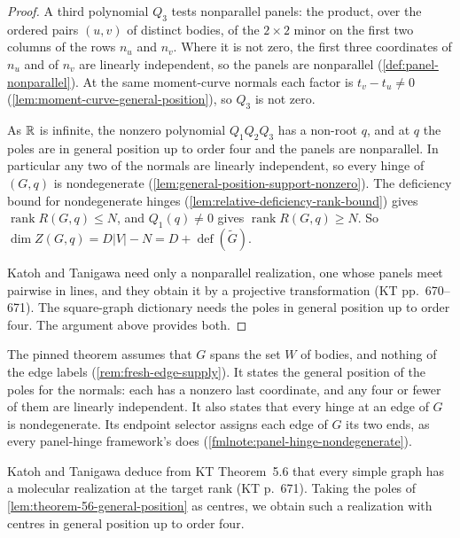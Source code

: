 \begin{proof}
  A third polynomial $Q_3$ tests nonparallel panels: the product, over
  the ordered pairs $(u, v)$ of distinct bodies, of the $2 \times 2$ minor
  on the first two columns of the rows $n_u$ and $n_v$. Where it is not
  zero, the first three coordinates of $n_u$ and of $n_v$ are linearly
  independent, so the panels are nonparallel
  (\cref{def:panel-nonparallel}). At the same moment-curve normals each
  factor is $t_v - t_u \neq 0$
  (\cref{lem:moment-curve-general-position}), so $Q_3$ is not zero.

  As ${\mathbb{R}}$ is infinite, the nonzero polynomial $Q_1 Q_2 Q_3$ has a non-root
  $q$, and at $q$ the poles are in general position up to order four and
  the panels are nonparallel. In
  particular any two of the normals are linearly independent, so every
  hinge of $(G, q)$ is nondegenerate
  (\cref{lem:general-position-support-nonzero}). The deficiency bound for
  nondegenerate hinges (\cref{lem:relative-deficiency-rank-bound}) gives
  $\operatorname{rank} R(G, q) \le N$, and $Q_1(q) \neq 0$ gives
  $\operatorname{rank} R(G, q) \ge N$. So
  $\dim Z(G, q) = D|V| - N = D + \operatorname{def}(\tilde G)$.

  Katoh and Tanigawa need only a nonparallel realization, one whose
  panels meet pairwise in lines, and they obtain it by a projective
  transformation (KT pp.~670--671). The square-graph dictionary needs the
  poles in general position up to order four. The argument above
  provides both.
\end{proof}

\begin{fmlnote}
  The pinned theorem assumes that $G$ spans the set $W$ of bodies, and
  nothing of the edge labels (\cref{rem:fresh-edge-supply}). It states the
  general position of the poles for the normals: each has a nonzero last
  coordinate, and any four or fewer of them are linearly independent. It
  also states that every hinge at an edge of $G$ is nondegenerate. Its
  endpoint selector assigns each edge of $G$ its two ends, as every
  panel-hinge framework's does (\cref{fmlnote:panel-hinge-nondegenerate}).
\end{fmlnote}

Katoh and Tanigawa deduce from KT Theorem~5.6 that every simple graph has
a molecular realization at the target rank (KT p.~671). Taking the poles
of \cref{lem:theorem-56-general-position} as centres, we obtain such a
realization with centres in general position up to order four.

